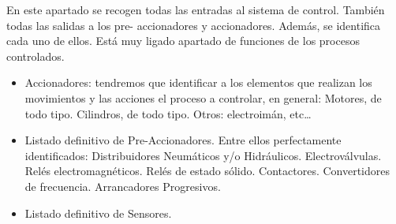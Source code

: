 \clearpage
{}
En este apartado se recogen todas las entradas al sistema de control. También todas las salidas a
los pre- accionadores y accionadores. Además, se identifica cada uno de ellos. Está muy ligado
apartado de funciones de los procesos controlados.

\begin{itemize}
	\item Accionadores: tendremos que identificar a los elementos que realizan los movimientos y
	      las acciones el proceso a controlar, en general: Motores, de todo tipo. Cilindros, de todo
	      tipo. Otros: electroimán, etc…
	\item Listado definitivo de Pre-Accionadores. Entre ellos perfectamente identificados:
	      Distribuidores Neumáticos y/o Hidráulicos. Electroválvulas. Relés electromagnéticos.
	      Relés de estado sólido. Contactores. Convertidores de frecuencia. Arrancadores
	      Progresivos.
	\item Listado definitivo de Sensores.
\end{itemize}
